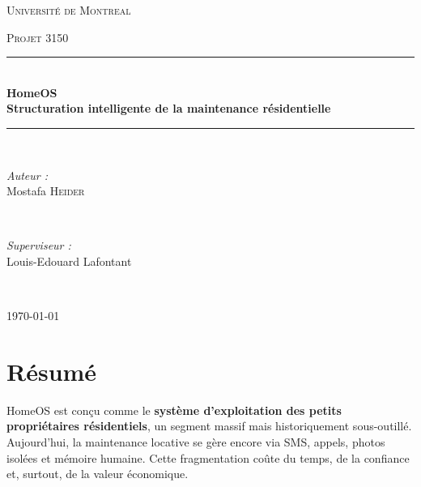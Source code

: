 \documentclass[11pt,a4paper]{article}
\begin{document}
\begin{titlepage}
    \centering
    \vspace*{2cm}
    
    {\scshape\LARGE Université de Montreal \par}
    \vspace{1.5cm}
    {\scshape\Large  Projet 3150 \par}
    \vspace{1.5cm}
    
    
    \rule{\linewidth}{0.5mm} \\[0.4cm]
    {\huge\bfseries HomeOS\\[0.4cm]
    \large Structuration intelligente de la maintenance résidentielle}
    \rule{\linewidth}{0.5mm} \\[1.5cm]
    
    \begin{minipage}{0.4\textwidth}
        \begin{flushleft} \large
            \emph{Auteur :}\\
            Mostafa \textsc{Heider}
        \end{flushleft}
    \end{minipage}~
    \begin{minipage}{0.4\textwidth}
        \begin{flushright} \large
            \emph{Superviseur :} \\
            Louis-Edouard Lafontant
        \end{flushright}
    \end{minipage}\\[2cm]
    
    \vfill
    {\large \today\par}
\end{titlepage}

\tableofcontents
\newpage

\section*{Résumé}

HomeOS est conçu comme le \textbf{système d'exploitation des petits propriétaires résidentiels}, un segment massif mais historiquement sous-outillé. Aujourd'hui, la maintenance locative se gère encore via SMS, appels, photos isolées et mémoire humaine. Cette fragmentation coûte du temps, de la confiance et, surtout, de la valeur économique.
\end{document}
